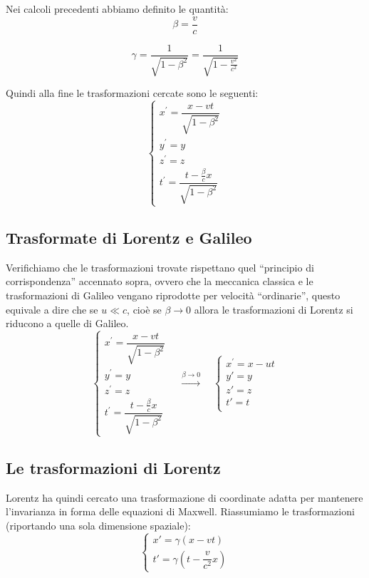 Nei calcoli precedenti abbiamo definito le quantità:
\begin{equation}
\beta = \dfrac{v}{c} 
\end{equation}

\begin{equation}
 \gamma = \dfrac{1}{\sqrt{1-\beta^2}} = \dfrac{1}{\sqrt{1 - \frac{v^2}{c^2}}}
\end{equation}

Quindi alla fine le trasformazioni cercate sono le seguenti:
\begin{equation}
\left\{
\begin{array}{l}
x^\prime=\dfrac{x-vt}{\sqrt{1-\beta^2}}\\
y^\prime=y\\
z^\prime=z\\
t^\prime=\dfrac{t-\frac{\beta}{c}x}{\sqrt{1-\beta^2}}
\end{array}\right.
\end{equation}

\subsection{Trasformate di Lorentz e Galileo}
Verifichiamo che le trasformazioni trovate rispettano quel ``principio di corrispondenza'' accennato sopra, ovvero che la meccanica
classica e le trasformazioni di Galileo vengano riprodotte per velocità ``ordinarie'', questo equivale a dire che se $u\ll c$,
cioè se $\beta\rightarrow 0$ allora le trasformazioni di Lorentz si riducono a quelle di Galileo.
\[\left\{
\begin{array}{l}
x^\prime=\dfrac{x-vt}{\sqrt{1-\beta^2}}\\
y^\prime=y\\
z^\prime=z\\
t^\prime=\dfrac{t-\frac{\beta}{c}x}{\sqrt{1-\beta^2}}
\end{array}\right.
\quad \stackrel{\beta\rightarrow 0}{\longrightarrow} \quad
\left\{
\begin{array}{l}
x^\prime=x-ut\\
y'=y\\
z'=z\\
t'=t\\
\end{array}\right.\]
 

\subsection{Le trasformazioni di Lorentz}
Lorentz ha quindi cercato una trasformazione di coordinate adatta per mantenere l’invarianza in forma delle equazioni di Maxwell. 
Riassumiamo le trasformazioni (riportando una sola dimensione spaziale):
\begin{equation}\label{Lorentz_riass}
  \left\{\begin{array}{ll}
   x' = \gamma \left(x - vt \right) \\
   t' = \gamma \left(t - \dfrac{v}{c^2}x \right)
  \end{array}\right.
\end{equation}

